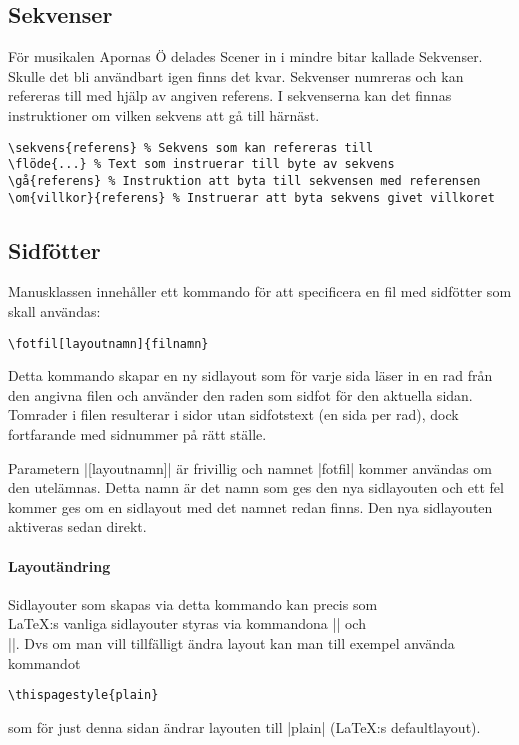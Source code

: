 \documentclass[a4paper,12pt]{article}
\begin{document}
\subsection{Sekvenser}
\label{sec:sekvenser}
För musikalen Apornas Ö delades Scener in i mindre bitar kallade Sekvenser. Skulle det bli användbart igen finns det kvar. Sekvenser numreras och kan refereras till med hjälp av angiven referens. I sekvenserna kan det finnas instruktioner om vilken sekvens att gå till härnäst.

\begin{lstlisting}
\sekvens{referens} % Sekvens som kan refereras till
\flöde{...} % Text som instruerar till byte av sekvens
\gå{referens} % Instruktion att byta till sekvensen med referensen
\om{villkor}{referens} % Instruerar att byta sekvens givet villkoret
\end{lstlisting}


\subsection{Sidfötter}
Manusklassen innehåller ett kommando för att specificera en fil med sidfötter som skall användas:

\begin{lstlisting}
\fotfil[layoutnamn]{filnamn}
\end{lstlisting}

Detta kommando skapar en ny sidlayout som för varje sida läser in en rad från den angivna filen och använder den raden som sidfot för den aktuella sidan. Tomrader i filen resulterar i sidor utan sidfotstext (en sida per rad), dock fortfarande med sidnummer på rätt ställe.

Parametern |[layoutnamn]| är frivillig och namnet |fotfil| kommer användas om den utelämnas. Detta namn är det namn som ges den nya sidlayouten och ett fel kommer ges om en sidlayout med det namnet redan finns. Den nya sidlayouten aktiveras sedan direkt.

\paragraph{Layoutändring} Sidlayouter som skapas via detta kommando kan precis som \\\LaTeX:s vanliga sidlayouter styras via kommandona |\pagestyle| och \\|\thispagestyle|. Dvs om man vill tillfälligt ändra layout kan man till exempel använda kommandot
\begin{lstlisting}
\thispagestyle{plain}
\end{lstlisting}
som för just denna sidan ändrar layouten till |plain| (\LaTeX:s defaultlayout).
\end{document}
